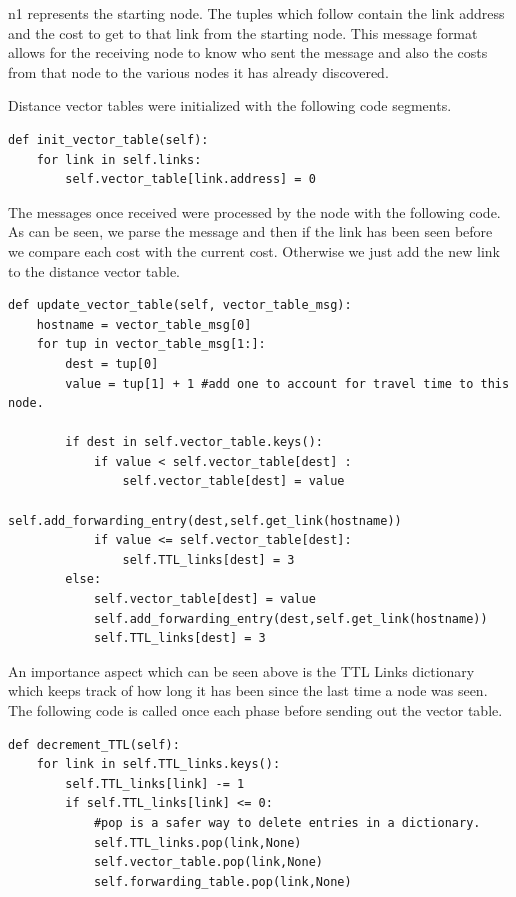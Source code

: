 \documentclass[11pt]{article}
\begin{document}
n1 represents the starting node. The tuples which follow contain the link address and the cost to get to that link from the starting node. This message format allows for the receiving node to know who sent the message and also the costs from that node to the various nodes it has already discovered.

Distance vector tables were initialized with the following code segments.

\begin{lstlisting}
def init_vector_table(self):
    for link in self.links:
        self.vector_table[link.address] = 0
\end{lstlisting}

The messages once received were processed by the node with the following code. As can be seen, we parse the message and then if the link has been seen before we compare each cost with the current cost. Otherwise we just add the new link to the distance vector table.

\begin{lstlisting}
def update_vector_table(self, vector_table_msg):
    hostname = vector_table_msg[0]
    for tup in vector_table_msg[1:]:
        dest = tup[0]
        value = tup[1] + 1 #add one to account for travel time to this node.
        
        if dest in self.vector_table.keys():
            if value < self.vector_table[dest] :
                self.vector_table[dest] = value
                self.add_forwarding_entry(dest,self.get_link(hostname))
            if value <= self.vector_table[dest]:
                self.TTL_links[dest] = 3
        else:
            self.vector_table[dest] = value
            self.add_forwarding_entry(dest,self.get_link(hostname))
            self.TTL_links[dest] = 3
\end{lstlisting}

An importance aspect which can be seen above is the TTL Links dictionary which keeps track of how long it has been since the last time a node was seen. The following code is called once each phase before sending out the vector table.

\begin{lstlisting}
def decrement_TTL(self):
    for link in self.TTL_links.keys():
        self.TTL_links[link] -= 1
        if self.TTL_links[link] <= 0:
            #pop is a safer way to delete entries in a dictionary.
            self.TTL_links.pop(link,None)
            self.vector_table.pop(link,None)
            self.forwarding_table.pop(link,None) 
\end{lstlisting}
\end{document}
